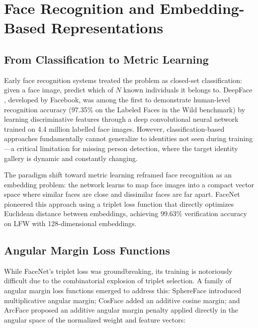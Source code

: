 \documentclass[12pt, a4paper]{article}
\begin{document}
\section{Face Recognition and Embedding-Based Representations}

\subsection{From Classification to Metric Learning}

Early face recognition systems treated the problem as closed-set classification: given a face image, predict which of $N$ known individuals it belongs to. DeepFace \cite{taigman2014}, developed by Facebook, was among the first to demonstrate human-level recognition accuracy (97.35\% on the Labeled Faces in the Wild benchmark) by learning discriminative features through a deep convolutional neural network trained on 4.4 million labelled face images. However, classification-based approaches fundamentally cannot generalize to identities not seen during training---a critical limitation for missing person detection, where the target identity gallery is dynamic and constantly changing.

The paradigm shift toward metric learning reframed face recognition as an embedding problem: the network learns to map face images into a compact vector space where similar faces are close and dissimilar faces are far apart. FaceNet \cite{schroff2015} pioneered this approach using a triplet loss function that directly optimizes Euclidean distance between embeddings, achieving 99.63\% verification accuracy on LFW with 128-dimensional embeddings.

\subsection{Angular Margin Loss Functions}

While FaceNet's triplet loss was groundbreaking, its training is notoriously difficult due to the combinatorial explosion of triplet selection. A family of angular margin loss functions emerged to address this: SphereFace \cite{liu2017sphereface} introduced multiplicative angular margin; CosFace \cite{wang2018cosface} added an additive cosine margin; and ArcFace \cite{deng2019arcface} proposed an additive angular margin penalty applied directly in the angular space of the normalized weight and feature vectors:
\end{document}
